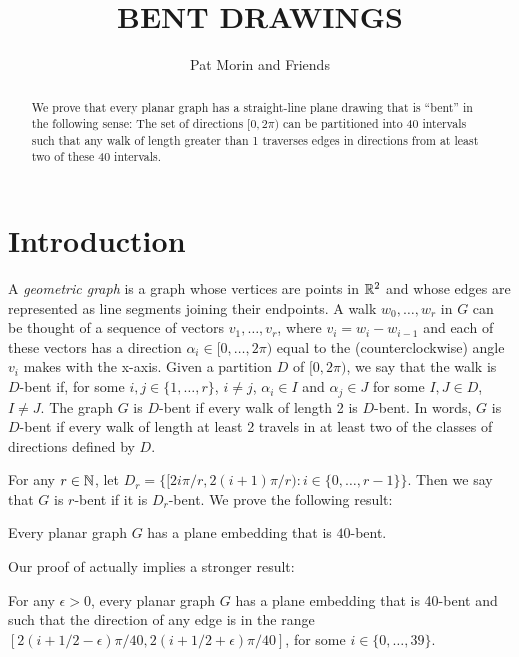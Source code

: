 \documentclass{patmorin}
\title{\MakeUppercase{Bent Drawings}}
\author{Pat Morin and Friends}%
\begin{document}
\maketitle
%
\begin{abstract}
  We prove that every planar graph has a straight-line plane drawing that is ``bent'' in the following sense: The set of directions $[0,2\pi)$ can be partitioned into 40 intervals such that any walk of length greater than 1 traverses edges in directions from at least two of these 40 intervals.
\end{abstract}
%
%


\section{Introduction}

A \emph{geometric graph} is a graph whose vertices are points in $\mathbb{R}^2$
and whose edges are represented as line segments joining their endpoints.
A walk $w_0,\ldots,w_r$ in $G$ can be thought of a sequence of vectors
$v_1,\ldots,v_r$, where $v_i=w_i-w_{i-1}$ and each of these vectors has
a direction $\alpha_i\in[0,\ldots,2\pi)$ equal to the (counterclockwise)
angle $v_i$ makes with the x-axis.  Given a partition $D$ of $[0,2\pi)$,
we say that the walk is $D$-bent if, for some $i,j\in\{1,\ldots,r\}$,
$i\neq j$,  $\alpha_i\in I$ and $\alpha_j\in J$ for some $I,J\in D$,
$I\neq J$. The graph $G$ is $D$-bent if every walk of length 2 is
$D$-bent.  In words, $G$ is $D$-bent if every walk of length at least
2 travels in at least two of the classes of directions defined by $D$.

For any $r\in\mathbb{N}$, let $D_r=\{[2i\pi/r,2(i+1)\pi/r): i\in
\{0,\ldots,r-1\}\}$.  Then we say that $G$ is $r$-bent if it is $D_r$-bent.
We prove the following result:

\begin{thm}
  Every planar graph $G$ has a plane embedding that is $40$-bent.
\end{thm}

Our proof of  actually implies a stronger result:

\begin{lem}
  For any $\epsilon>0$, every planar graph $G$ has a plane embedding that is 40-bent and such that the direction of any edge is in the range $[2(i+1/2-\epsilon)\pi/40,2(i+1/2+\epsilon)\pi/40]$, for some $i\in\{0,\ldots,39\}$.
\end{lem}
\end{document}
